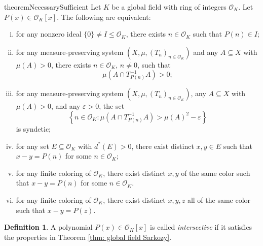 \documentclass{amsart}
\theoremstyle{definition}
\newtheorem{definition}[theorem]{Definition}
\numberwithin{equation}{section}
\newcommand{\mO}{\mathcal{O}}
\newcommand{\eps}{\varepsilon}
\begin{document}
\begin{restatable}{theorem}{NecessarySufficient} \label{thm: global field Sarkozy}
    Let $K$ be a global field with ring of integers $\mO_K$.
    Let $P(x) \in \mO_K[x]$.
    The following are equivalent:
    \begin{enumerate}[(i)]
        \item for any nonzero ideal $\{0\} \ne I \le \mO_K$, there exists $n \in \mO_K$ such that $P(n) \in I$;
        \item for any measure-preserving system $\left( X, \mu, (T_n)_{n \in \mO_K} \right)$ and any $A \subseteq X$ with $\mu(A) > 0$, there exists $n \in \mO_K$, $n \ne 0$, such that
        \begin{equation*}
            \mu \left( A \cap T_{P(n)}^{-1}A \right) > 0;
        \end{equation*}
        \item for any measure-preserving system $\left( X, \mu, (T_n)_{n \in \mO_K} \right)$, any $A \subseteq X$ with $\mu(A) > 0$, and any $\eps > 0$, the set
        \begin{equation*}
            \left\{ n \in \mO_K : \mu \left( A \cap T_{P(n)}^{-1}A \right) > \mu(A)^2 - \eps \right\}
        \end{equation*}
        is syndetic;
        \item for any set $E \subseteq \mO_K$ with $d^*(E) > 0$, there exist distinct $x, y \in E$ such that $x - y = P(n)$ for some $n \in \mO_K$;
        \item for any finite coloring of $\mO_K$, there exist distinct $x, y$ of the same color such that $x - y = P(n)$ for some $n \in \mO_K$.
        \item for any finite coloring of $\mO_K$, there exist distinct $x, y, z$ all of the same color such that $x - y = P(z)$.
    \end{enumerate}
\end{restatable}

\begin{definition} \label{defn: intersective}
    A polynomial $P(x) \in \mO_K[x]$ is called \emph{intersective} if it satisfies the properties in Theorem \ref{thm: global field Sarkozy}.
\end{definition}
\end{document}
